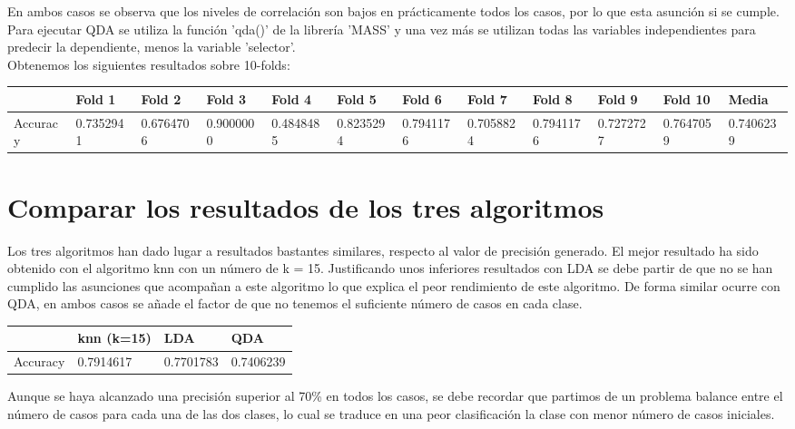 En ambos casos se observa que los niveles de correlación son bajos en prácticamente todos los casos, por lo que esta asunción si se cumple.\\

Para ejecutar QDA se utiliza la función 'qda()' de la librería 'MASS' y una vez más se utilizan todas las variables independientes para predecir la dependiente, menos la variable 'selector'. \\

Obtenemos los siguientes resultados sobre 10-folds:
\begin{table}[!h]
	\resizebox{15cm}{!} {
	\begin{tabular}{l|lllllllllll}
		& Fold 1    & Fold 2    & Fold 3    & Fold 4    & Fold 5    & Fold 6    & Fold 7    & Fold 8    & Fold 9    & Fold 10   & Media     \\ \hline
		Accuracy & 0.7352941 & 0.6764706 & 0.9000000 & 0.4848485 & 0.8235294 & 0.7941176 & 0.7058824 & 0.7941176 & 0.7272727 & 0.7647059 & 0.7406239
	\end{tabular}
}
\end{table}




\newpage
\section{Comparar los resultados de los tres algoritmos}
Los tres algoritmos han dado lugar a resultados bastantes similares, respecto al valor de precisión generado. El mejor resultado ha sido obtenido con el algoritmo knn con un número de k = 15. Justificando unos inferiores resultados con LDA se debe partir de que no se han cumplido las asunciones que acompañan a este algoritmo lo que explica el peor rendimiento de este algoritmo. De forma similar ocurre con QDA, en ambos casos se añade el factor de que no tenemos el suficiente número de casos en cada clase.

\begin{table}[!h]
	\centering
	\begin{tabular}{l|lll}
		& knn (k=15) & LDA       & QDA       \\ \hline
		Accuracy & 0.7914617  & 0.7701783 & 0.7406239
	\end{tabular}
\end{table}

Aunque se haya alcanzado una precisión superior al 70\% en todos los casos, se debe recordar que partimos de un problema balance entre el número de casos para cada una de las dos clases, lo cual se traduce en una peor clasificación la clase con menor número de casos iniciales.\\


